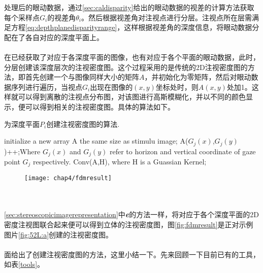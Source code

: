 处理后的眼动数据，通过\ref{sec:caldisparity}给出的眼动数据的视差的计算方法获取每个采样点$G_i$的视差角$\theta_i$。然后根据视差角对注视点进行分层。注视点所在层需满足方程\ref{eq:depthplanedisparityrange}，这样根据视差角的深度信息，将眼动数据分配在了各自对应的深度平面上。
\\[0.2cm]
\\[0.2cm]
在已经获取了对应于各深度平面的图像，也有对应于各个平面的眼动数据，此时，分层创建该深度层次的注视密度图。这个过程采用的是传统的2D注视密度图的方法，即首先创建一个与图像同样大小的矩阵$A$，并初始化为零矩阵，然后对眼动数据序列进行遍历，当视点$G_i$出现在图像的$(x,y)$坐标处时，则$A(x,y)$处加1。这样就可以得到离散的注视点分布图，对该图进行高斯模糊化，并以不同的颜色显示，便可以得到相关的注视密度图。具体的算法如下。
\begin{algorithm}
\caption{ 为深度平面$P_i$创建注视密度图的算法.}
\label{alg:createfdm}
\begin{algorithmic}[1]
\STATE initialize a new array A the same size as stimulu image;
\STATE A(${G_{j}}(x)$,${G_{j}}(y)$)++;Where ${G_{j}}(x)$ and ${G_{j}}(y)$ refer to  horizon and vertical coordinate of gaze point ${G_{j}}$ respectively.
\ENDFOR
\STATE Conv(A,H), where H is a Guassian Kernel;
\label{code:guassian}
\end{algorithmic}
\end{algorithm}
\begin{figure}[t]
  \centering
  \texttt{[image: chap4/fdmresult]}
\end{figure}
\\[0.2cm]
\\[0.2cm]
\ref{sec:stereoscopicimagerepresentation}中\textbf{\emph{e}}的方法一样，将对应于各个深度平面的2D密度注视图联合起来便可以得到立体的注视密度图，图\ref{fig:fdmresult}是正对示例图片\ref{fig:52L:a}创建的注视密度图。
\\[0.2cm]
\\[0.2cm]
面给出了创建注视密度图的方法，这里小结一下。先来回顾一下目前已有的工具，如表\ref{tools}。
